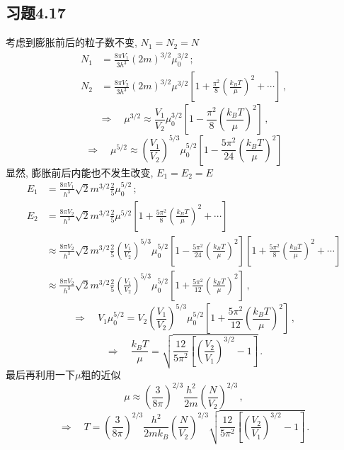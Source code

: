\documentclass[letterpaper, 10pt]{article}
\begin{document}
\subsection{习题4.17}
考虑到膨胀前后的粒子数不变, $N_{1} = N_{2} = N$
\begin{align*}
N_{1} & = \frac{8 \pi V_{1}}{3 h^3} (2m)^{3/2} \mu_{0}^{3/2} \,; \\
N_{2} & = \frac{8 \pi V_{2}}{3 h^3} (2m)^{3/2} \mu^{3/2} \left[ 1 + \frac{\pi^2}{8}\left( \frac{k_{B} T}{\mu} \right)^2 + \cdots \right] \,,
\end{align*}
\[ \Rightarrow \quad{} \mu^{3/2} \approx \frac{V_1}{V_2} \mu_{0}^{3/2} \left[ 1 - \frac{\pi^2}{8} \left( \frac{k_{B} T}{\mu} \right)^2 \right] \,, \]
\[ \Rightarrow \quad{} \mu^{5/2} \approx \left( \frac{V_{1}}{V_{2}} \right)^{5/3} \mu_{0}^{5/2} \left[ 1 - \frac{5\pi^2}{24} \left( \frac{k_{B} T}{\mu} \right)^{2} \right] \]
显然, 膨胀前后内能也不发生改变, $E_{1} = E_{2} = E$
\begin{align*}
E_{1} & = \frac{8\pi V_{1}}{h^{3}} \sqrt{2} m^{3/2} \frac{2}{5} \mu_{0}^{5/2} \,; \\
E_{2} & = \frac{8\pi V_{2}}{h^{3}} \sqrt{2} m^{3/2} \frac{2}{5} \mu^{5/2} \left[ 1 + \frac{5\pi^{2}}{8} \left( \frac{k_{B}T}{\mu} \right)^{2} + \cdots \right] \\
& \approx \frac{8\pi V_{2}}{h^{3}} \sqrt{2} m^{3/2} \frac{2}{5} \left( \frac{V_{1}}{V_{2}} \right)^{5/3} \mu_{0}^{5/2} \left[ 1 - \frac{5\pi^2}{24} \left( \frac{k_{B} T}{\mu} \right)^{2} \right] \left[ 1 + \frac{5\pi^{2}}{8} \left( \frac{k_{B}T}{\mu} \right)^{2} + \cdots \right] \\
& \approx \frac{8\pi V_{2}}{h^{3}} \sqrt{2} m^{3/2} \frac{2}{5} \left( \frac{V_{1}}{V_{2}} \right)^{5/3} \mu_{0}^{5/2} \left[ 1 + \frac{5\pi^{2}}{12} \left( \frac{k_{B}T}{\mu} \right)^{2} \right] \,,
\end{align*}
\[ \Rightarrow \quad{} V_{1} \mu_{0}^{5/2} = V_{2} \left( \frac{V_{1}}{V_{2}} \right)^{5/3} \mu_{0}^{5/2} \left[ 1 + \frac{5\pi^{2}}{12} \left( \frac{k_{B}T}{\mu} \right)^{2} \right] \,, \]
\[ \Rightarrow \quad{} \frac{k_{B}T}{\mu} = \sqrt{ \frac{12}{5\pi^{2}} \left[ \left( \frac{V_{2}}{V_{1}} \right)^{3/2} - 1 \right] }\,. \]
最后再利用一下$\mu$粗的近似
\[ \mu \approx \left( \frac{3}{8\pi} \right)^{2/3} \frac{h^{2}}{2m} \left(\frac{N}{V_{2}} \right)^{2/3}\,, \]
\[ \Rightarrow \quad{} T = \left( \frac{3}{8\pi} \right)^{2/3} \frac{h^{2}}{2mk_{B}} \left(\frac{N}{V_{2}} \right)^{2/3} \sqrt{ \frac{12}{5\pi^{2}} \left[ \left( \frac{V_{2}}{V_{1}} \right)^{3/2} - 1 \right] }\,. \]
\end{document}
